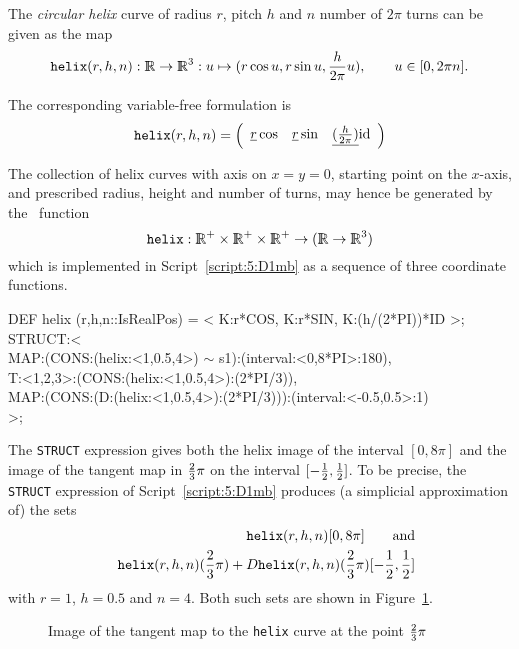 \documentclass{31x47jw}
\begin{document}
\begin{example}
    
The \emph{circular helix} curve of radius $r$,
pitch $h$ and $n$ number of $2\pi$ turns can be given as the map
\[
\texttt{helix}(r,h,n) : \mathbb{I\!\!R}\rightarrow\mathbb{I\!\!R}^{3} :
u \mapsto (r \cos u, r \sin u, {h\over 2\pi} u ), 
\qquad u\in[0,2\pi n].
\]

The corresponding variable-free formulation is
\[
\texttt{helix}(r,h,n) = {\left(\begin{array}{cccccccc}\underline{r} \cos & \underline{r} \sin &
\underline{({h \over 2\pi})} \mbox{id}\end{array}\right)}
\]

The collection of helix curves with axis on $x=y=0$, starting point on
the $x$-axis, and prescribed radius, height and number of turns, may hence be 
generated by the \pl\ function
\[
\texttt{helix} : \R^{+}\times\R^{+}\times \R^{+} \rightarrow
(\R\rightarrow\R^{3})
\]
which is implemented in Script~\ref{script:5:D1mb} as a sequence of
three coordinate functions.
    
\begin{script}
\begin{smallplasm}   
    DEF helix (r,h,n::IsRealPos) = 
  < K:r*COS, K:r*SIN, K:(h/(2*PI))*ID >;\\[0.3cm]

STRUCT:<\+\\
  MAP:(CONS:(helix:<1,0.5,4>) $\sim$ s1):(interval:<0,8*PI>:180),\\
  T:<1,2,3>:(CONS:(helix:<1,0.5,4>):(2*PI/3)),\\
  MAP:(CONS:(D:(helix:<1,0.5,4>):(2*PI/3))):(interval:<-0.5,0.5>:1)\-\\
>;
\end{smallplasm} 
\label{script:5:D1mb}
\end{script}
The \texttt{STRUCT} expression gives both the helix image of the
interval $[0,8\pi]$ and the image of the tangent map in ${2\over
3}\pi$ on the interval $[-{1\over 2}, {1\over 2}]$.  To be precise,
the \texttt{STRUCT} expression of Script~\ref{script:5:D1mb} produces
(a simplicial approximation of) the sets
\begin{eqnarray*} 
&&\texttt{helix}(r,h,n)[0,8\pi] \qquad\mbox{and}
\\
&&\texttt{helix}(r,h,n)({2\over 3}\pi) + D
\texttt{helix}(r,h,n)({2\over 3}\pi)[-{1\over 2},{1\over 2}]
\end{eqnarray*}
with $r=1$, $h=0.5$ and $n=4$.  Both such sets are shown in
Figure~\ref{figure:5:ex3}.

\begin{figure}[htb]
\centering
{}
\caption{Image of the tangent map to the \texttt{helix} curve
at the point ${2\over 3}\pi$
\label{figure:5:ex3}}
\end{figure}

\end{example}
\end{document}

